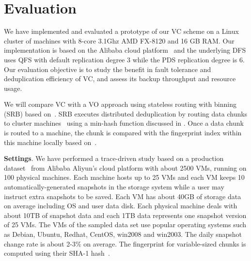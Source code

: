 \section{Evaluation}
\label{sect:evaluation}
We have implemented and evaluated a prototype of our VC scheme on a Linux cluster of machines with
8-core 3.1Ghz AMD FX-8120 and 16 GB RAM. 
Our implementation is based on the Alibaba cloud platform~\cite{Aliyun,WeiZhangIEEE}
and the underlying DFS uses  QFS with default replication degree 3 while the PDS replication degree is 6.
Our evaluation objective is to
study the benefit in fault tolerance and   deduplication efficiency of VC,  
and assess its backup throughput and  resource usage. 

We will compare VC with a VO approach  using stateless routing with binning (SRB) 
based on~\cite{Dong2011,extreme_binning09}.
SRB executes distributed deduplication by routing data chunks to cluster machines~\cite{Dong2011}
using  a min-hash function discussed in \cite{extreme_binning09}. Once a data chunk is routed to
a machine, the chunk is compared with the fingerprint index within this machine locally based 
on~\cite{extreme_binning09}.

{\bf Settings}.
We have performed a trace-driven study based on a production dataset~\cite{WeiZhangIEEE} from 
Alibaba Aliyun's cloud platform with about 2500 VMs, running on 100 physical machines. 
Each machine hosts up to 25 VMs and each VM keeps 10 automatically-generated snapshots in the storage 
system while a user may instruct extra snapshots to be saved.
Each VM has about 40GB of storage  data  on average
including OS and user data disk.
Each physical machine deals with about 10TB of snapshot data and each 1TB data represents one snapshot version
of 25 VMs.  The VMs of the sampled data set use popular operating systems such as 
Debian, Ubuntu, Redhat, CentOS, win2008 and win2003. 
The daily snapshot change rate is about 2-3\% on average.
The fingerprint for variable-sized chunks is computed using their SHA-1 hash~\cite{similar94,rabin81}. 

